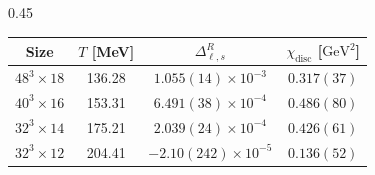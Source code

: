 \documentclass[10pt, aspectratio=169]{beamer} %
\begin{document}
\begin{frame}[noframenumbering]
\begin{columns}[T]
\begin{column}{0.45\textwidth}
\begin{tabular}{cccc}
            \toprule
            Size & $T$ [MeV] & $\Delta_{\ell,s}^R$ & $\chi_{\mathrm{disc}}$ [$\mathrm{GeV}^2$] \\
            \midrule
            $48^3\times 18$ & 136.28 & $1.055(14)\times 10^{-3}$ & $0.317(37)$ \\
            $40^3\times 16$ & 153.31 & $6.491(38)\times 10^{-4}$ & $0.486(80)$ \\
            $32^3\times 14$ & 175.21 & $2.039(24)\times 10^{-4}$ & $0.426(61)$ \\
            $32^3\times 12$ & 204.41 & $-2.10(242)\times 10^{-5}$ & $0.136(52)$ \\
            \bottomrule
        \end{tabular}
    \end{column}
\end{columns}
\vfill
\end{frame}
\end{document}
